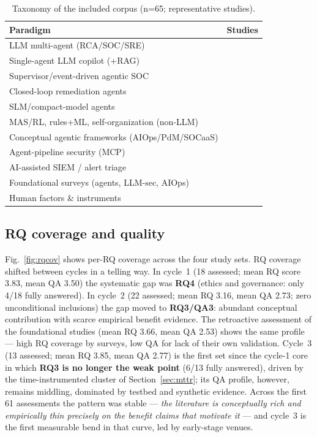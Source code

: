 \documentclass{ieeeaccess}
\begin{document}
\begin{table}[!t]
\caption{Taxonomy of the included corpus (n=65; representative studies).}
\label{tab:taxonomy}
\centering
\begin{tabular}{@{}p{}p{}@{}}
\toprule
\textbf{Paradigm} & \textbf{Studies} \\
\midrule
LLM multi-agent (RCA/SOC/SRE) & \cite{P27,P28,P31,P35,P76,P100,P102} \\
Single-agent LLM copilot (+RAG) & \cite{P34,P78,P83,P87,P119} \\
Supervisor/event-driven agentic SOC & \cite{P93,P101} \\
Closed-loop remediation agents & \cite{P20,P22,P32,P123} \\
SLM/compact-model agents & \cite{P21} \\
MAS/RL, rules+ML, self-organization (non-LLM) & \cite{P25,P88,P91} \\
Conceptual agentic frameworks (AIOps/PdM/SOCaaS) & \cite{P43,P82,P97} \\
Agent-pipeline security (MCP) & \cite{P94} \\
AI-assisted SIEM / alert triage & \cite{P73} \\
Foundational surveys (agents, LLM-sec, AIOps) &
\cite{P05,P09,P10,P14,P15,P16,P24,P33,P52,P54,P72,P77,P79,P110,P112,P121} \\
Human factors \& instruments & \cite{P37,P62,P63,P69,P81} \\
\bottomrule
\end{tabular}
\end{table}

\subsection{RQ coverage and quality}
Fig.~\ref{fig:rqcov} shows per-RQ coverage across the four study sets.
RQ coverage shifted between cycles in a telling way. In cycle~1
(18 assessed; mean RQ score 3.83, mean QA 3.50) the systematic gap was
\textbf{RQ4} (ethics and governance: only 4/18 fully answered). In
cycle~2 (22 assessed; mean RQ 3.16, mean QA 2.73; zero unconditional
inclusions) the gap moved to \textbf{RQ3/QA3}: abundant conceptual
contribution with scarce empirical benefit evidence. The retroactive
assessment of the foundational studies (mean RQ 3.66, mean QA 2.53)
shows the same profile --- high RQ coverage by surveys, low QA for lack
of their own validation. Cycle~3 (13 assessed; mean RQ 3.85, mean QA
2.77) is the first set since the cycle-1 core in which \textbf{RQ3 is no
longer the weak point} (6/13 fully answered), driven by the
time-instrumented cluster of Section~\ref{sec:mttr}; its QA profile,
however, remains middling, dominated by testbed and synthetic evidence.
Across the first 61 assessments the pattern was stable --- \emph{the
literature is conceptually rich and empirically thin precisely on the
benefit claims that motivate it} --- and cycle~3 is the first measurable
bend in that curve, led by early-stage venues.
\end{document}
